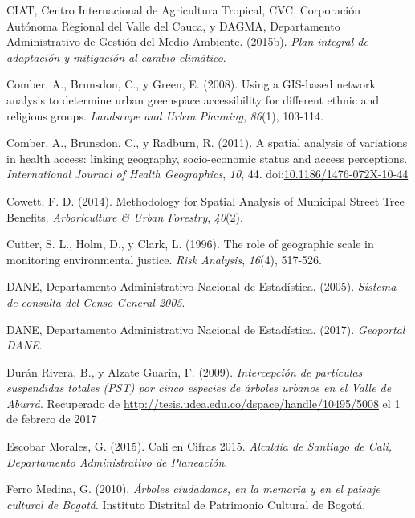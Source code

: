 \documentclass[12pt,a4paper,openany]{book}
\theoremstyle{definition}
\theoremstyle{definition}
\theoremstyle{definition}
\theoremstyle{remark}
\begin{document}
\hypertarget{ref-ciat_plan_2015}{}
CIAT, Centro Internacional de Agricultura Tropical, CVC, Corporación
Autónoma Regional del Valle del Cauca, y DAGMA, Departamento
Administrativo de Gestión del Medio Ambiente. (2015b). \emph{Plan
integral de adaptación y mitigación al cambio climático}.

\hypertarget{ref-comber_using_2008}{}
Comber, A., Brunsdon, C., y Green, E. (2008). Using a GIS-based network
analysis to determine urban greenspace accessibility for different
ethnic and religious groups. \emph{Landscape and Urban Planning},
\emph{86}(1), 103-114.

\hypertarget{ref-comber_spatial_2011}{}
Comber, A., Brunsdon, C., y Radburn, R. (2011). A spatial analysis of
variations in health access: linking geography, socio-economic status
and access perceptions. \emph{International Journal of Health
Geographics}, \emph{10}, 44.
doi:\href{https://doi.org/10.1186/1476-072X-10-44}{10.1186/1476-072X-10-44}

\hypertarget{ref-cowett_methodology_2014}{}
Cowett, F. D. (2014). Methodology for Spatial Analysis of Municipal
Street Tree Benefits. \emph{Arboriculture \& Urban Forestry},
\emph{40}(2).

\hypertarget{ref-cutter_role_1996}{}
Cutter, S. L., Holm, D., y Clark, L. (1996). The role of geographic
scale in monitoring environmental justice. \emph{Risk Analysis},
\emph{16}(4), 517-526.

\hypertarget{ref-censo_sistema_dane}{}
DANE, Departamento Administrativo Nacional de Estadística. (2005).
\emph{Sistema de consulta del Censo General 2005}.

\hypertarget{ref-geoportal_DANE}{}
DANE, Departamento Administrativo Nacional de Estadística. (2017).
\emph{Geoportal DANE}.

\hypertarget{ref-duran_rivera_intercepcion_2009}{}
Durán Rivera, B., y Alzate Guarín, F. (2009). \emph{Intercepción de
partículas suspendidas totales (PST) por cinco especies de árboles
urbanos en el Valle de Aburrá}. Recuperado de
\url{http://tesis.udea.edu.co/dspace/handle/10495/5008} el 1 de febrero
de 2017

\hypertarget{ref-escobar2015cali}{}
Escobar Morales, G. (2015). Cali en Cifras 2015. \emph{Alcaldía de
Santiago de Cali, Departamento Administrativo de Planeación}.

\hypertarget{ref-ferro_medina_arboles_2010}{}
Ferro Medina, G. (2010). \emph{Árboles ciudadanos, en la memoria y en el
paisaje cultural de Bogotá}. Instituto Distrital de Patrimonio Cultural
de Bogotá.
\end{document}
